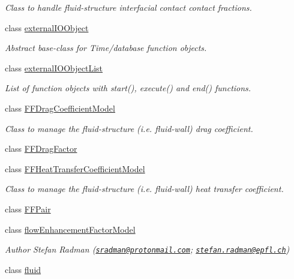 \begin{DoxyCompactItemize}
\begin{DoxyCompactList}\small\item\em Class to handle fluid-\/structure interfacial contact contact fractions. \end{DoxyCompactList}\item 
class \hyperlink{classFoam_1_1externalIOObject}{external\+I\+O\+Object}
\begin{DoxyCompactList}\small\item\em Abstract base-\/class for Time/database function objects. \end{DoxyCompactList}\item 
class \hyperlink{classFoam_1_1externalIOObjectList}{external\+I\+O\+Object\+List}
\begin{DoxyCompactList}\small\item\em List of function objects with start(), execute() and end() functions. \end{DoxyCompactList}\item 
class \hyperlink{classFoam_1_1FFDragCoefficientModel}{F\+F\+Drag\+Coefficient\+Model}
\begin{DoxyCompactList}\small\item\em Class to manage the fluid-\/structure (i.\+e. fluid-\/wall) drag coefficient. \end{DoxyCompactList}\item 
class \hyperlink{classFoam_1_1FFDragFactor}{F\+F\+Drag\+Factor}
\item 
class \hyperlink{classFoam_1_1FFHeatTransferCoefficientModel}{F\+F\+Heat\+Transfer\+Coefficient\+Model}
\begin{DoxyCompactList}\small\item\em Class to manage the fluid-\/structure (i.\+e. fluid-\/wall) heat transfer coefficient. \end{DoxyCompactList}\item 
class \hyperlink{classFoam_1_1FFPair}{F\+F\+Pair}
\item 
class \hyperlink{classFoam_1_1flowEnhancementFactorModel}{flow\+Enhancement\+Factor\+Model}
\begin{DoxyCompactList}\small\item\em Author Stefan Radman (\href{mailto:sradman@protonmail.com}{\tt sradman@protonmail.\+com}; \href{mailto:stefan.radman@epfl.ch}{\tt stefan.\+radman@epfl.\+ch}) \end{DoxyCompactList}\item 
class \hyperlink{classFoam_1_1fluid}{fluid}
\item 

\end{DoxyCompactItemize}
